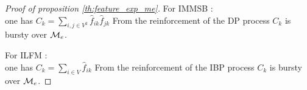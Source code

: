 \begin{proof}[Proof of proposition \ref{th:feature_exp_me}]

For IMMSB : ~\\

one has $C_k = \sum_{i,j \in V^2} \hat f_{ik} \hat f_{jk}$
From the reinforcement of the DP process $C_k$ is bursty over $\mathcal{M}_e$.

For ILFM : ~\\

one has $C_k = \sum_{i \in V} \hat f_{ik}$
From the reinforcement of the IBP process $C_k$ is bursty over $\mathcal{M}_e$.
\end{proof}



